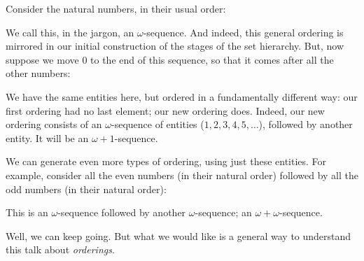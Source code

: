 \documentclass[../../../include/open-logic-section]{subfiles}
\begin{document}
Consider the natural numbers, in their usual order:
\begin{center}
\end{center}
We call this, in the jargon, an $\omega$-sequence. And indeed, this general ordering is mirrored in our initial construction of the stages of the set hierarchy. But, now suppose we move $0$ to the end of this sequence, so that it comes after all the other numbers:
\begin{center}
\end{center}
We have the same entities here, but ordered in a fundamentally different way: our first ordering had no last element; our new ordering does. Indeed, our new ordering consists of an $\omega$-sequence of entities ($1, 2, 3, 4, 5, \ldots$), followed by another entity. It will be an $\omega+1$-sequence.

We can generate even more types of ordering, using just these entities. For example, consider all the even numbers (in their natural order) followed by all the odd numbers (in their natural order):
\begin{center}
\end{center}
This is an $\omega$-sequence followed by another $\omega$-sequence; an $\omega+\omega$-sequence. 

Well, we can keep going. But what we would like is a general way to understand this talk about \emph{orderings}. 
\end{document}
